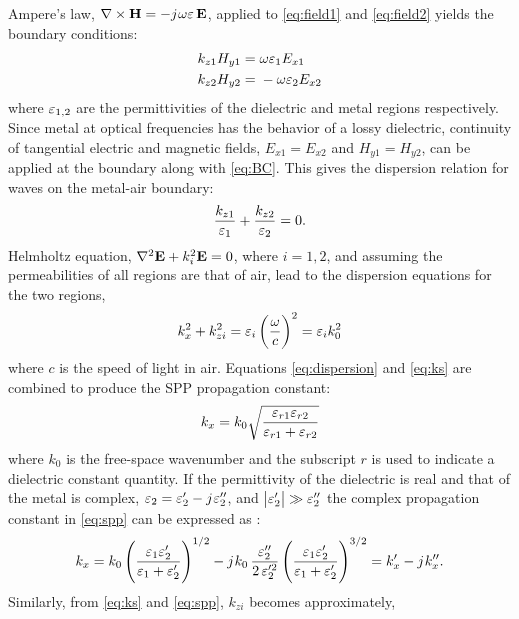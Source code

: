 Ampere's law, $ \nabla\times{\mathbf{H}} = -j\mkern1mu \omega \varepsilon \,\mathbf{E}$, applied to \eqref{eq:field1} and \eqref{eq:field2} yields the boundary conditions:
%
\begin{subequations}
  \begin{align}
    k_{z1} H_{y1} ={}& \omega \varepsilon_1 E_{x1}
    \label{eq:bc1} \\
    k_{z2} H_{y2} ={}& -\omega \varepsilon_2 E_{x2}
    \label{eq:bc2}
  \end{align}
  \label{eq:BC}%
\end{subequations}
%
where $\varepsilon_{1,2}$ are the permittivities of the dielectric and metal regions respectively. Since metal at optical frequencies has the behavior of a lossy dielectric, continuity of tangential electric and magnetic fields, $E_{x1} = E_{x2}$ and $H_{y1} = H_{y2}$, can be applied at the boundary along with \eqref{eq:BC}. This gives the dispersion relation for waves on the metal-air boundary:
%
\begin{equation}
  \frac{k_{z1}}{\varepsilon_1} + \frac{k_{z2}}{\varepsilon_2} = 0.
  \label{eq:dispersion}
\end{equation}
%
Helmholtz equation, $\nabla^2 \mathbf{E} + k_i^2 \mathbf{E} = 0$, where $i = 1,2$, and assuming the permeabilities of all regions are that of air, lead to the dispersion equations for the two regions,
%
\begin{equation}
  k_x^2 + k_{zi}^2 = \varepsilon_i \left( \frac{\omega}{c} \right)^2 = \varepsilon_i k_0^2
  \label{eq:ks}
\end{equation}
%
where $c$ is the speed of light in air. Equations \eqref{eq:dispersion} and \eqref{eq:ks} are combined to produce the SPP propagation constant:
%
\begin{equation}
  k_x = k_0 \sqrt{\frac{\varepsilon_{r1} \varepsilon_{r2}}{\varepsilon_{r1} + \varepsilon_{r2}}}
  \label{eq:spp}
\end{equation}
%
where $k_0$ is the free-space wavenumber and the subscript $r$ is used to indicate a dielectric constant quantity. If the permittivity of the dielectric is real and that of the metal is complex, $\varepsilon_2 = \varepsilon_2' - j\mkern1mu \varepsilon_2''$, and $\left|\varepsilon_2' \right| \gg \varepsilon_2''$  the complex propagation constant in \eqref{eq:spp} can be expressed as \cite{Raether1988}:
%
\begin{equation}
  k_x = k_0 \left( \frac{\varepsilon_1 \varepsilon_2'}{\varepsilon_1 + \varepsilon_2'} \right)^{1/2} - j\mkern1mu k_0 \, \frac{\varepsilon_2''}{2 \,\varepsilon_2'^2} \left( \frac{ \varepsilon_1 \varepsilon_2'}{\varepsilon_1 + \varepsilon_2'} \right)^{3/2} = k_x' - j\mkern1mu k_x''.
  \label{eq:complec_kx}
\end{equation}
%
Similarly, from \eqref{eq:ks} and \eqref{eq:spp}, $k_{zi}$ becomes approximately,
%
